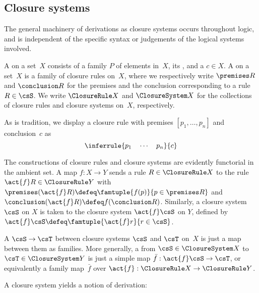 \subsection{Closure systems}

The general machinery of derivations as closure systems occurs throughout logic, and is independent of the specific syntax or judgements of the logical systems involved.

\begin{definition}
  \label{def:closure-rule}\label{def:closure-system}%
  A  on a set~$X$ consists of a family $P$ of elements in~$X$, its , and a  $c \in X$.
  A  on a set~$X$ is a family of closure rules on~$X$, where we respectively write $\premises R$ and $\conclusion R$ for the premises and the conclusion corresponding to a rule $R \in \csS$.
  We write $\ClosureRule X$ and $\ClosureSystem X$ for the collections of closure rules and closure systems on~$X$, respectively.
\end{definition}

As is tradition, we display a closure rule with premises $[p_1,\ldots,p_n]$ and conclusion~$c$ as
%
\[
  \inferrule{p_1 \quad \cdots \quad p_n}{c}
\]
%

The constructions of closure rules and closure systems are evidently functorial in the ambient set.
%
A map $f : X \to Y$ sends a rule $R \in \ClosureRule X$ to the rule $\act{f} R \in \ClosureRule Y$ with $\premises (\act{f} R) \defeq \famtuple{f(p)}{p \in \premises R}$ and $\conclusion (\act{f} R) \defeq f(\conclusion R)$.
%
Similarly, a closure system $\csS$ on $X$ is taken to the closure system $\act{f} \csS$ on $Y$, defined by $\act{f} \csS \defeq \famtuple{\act{f} r}{r \in \csS}$.

\begin{definition}
  A  $\csS \to \csT$ between closure systems $\csS$ and $\csT$ on~$X$ is just a map between them as families.
  More generally, a  from $\csS \in \ClosureSystem X$ to $\csT \in \ClosureSystem Y$
  is just a simple map $\bar{f} : \act{f}\csS \to \csT$, or equivalently a family map~$\bar{f}$ over $\act{f} : \ClosureRule X \to \ClosureRule Y$.
\end{definition}

A closure system yields a notion of derivation:

